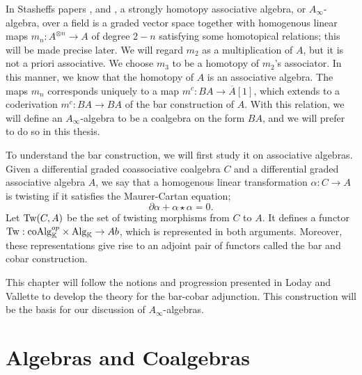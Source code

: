\documentclass[../thesis.tex]{subfiles}
\begin{document}
        In Stasheffs papers \cite{Stasheff63I}, and \cite{Stasheff63II}, a strongly homotopy associative algebra, or $A_\infty$-algebra, over a field is a graded vector space together with homogenous linear maps $m_n: A^{\otimes n}\rightarrow A$ of degree $2-n$ satisfying some homotopical relations; this will be made precise later. We will regard $m_2$ as a multiplication of $A$, but it is not a priori associative. We choose $m_3$ to be a homotopy of $m_2$'s associator. In this manner, we know that the homotopy of $A$ is an associative algebra. The maps $m_n$ corresponds uniquely to a map $m^c:BA\rightarrow \overline{A}[1]$, which extends to a coderivation $m^c : BA\rightarrow BA$ of the bar construction of $A$. With this relation, we will define an $A_\infty$-algebra to be a coalgebra on the form $BA$, and we will prefer to do so in this thesis.


        To understand the bar construction, we will first study it on associative algebras. Given a differential graded coassociative coalgebra $C$ and a differential graded associative algebra $A$, we say that a homogenous linear transformation $\alpha: C\rightarrow A$ is twisting if it satisfies the Maurer-Cartan equation;
            \begin{equation*}
                \partial\alpha + \alpha\star\alpha = 0.
            \end{equation*}
        Let $\tt{Tw}(C, A)$ be the set of twisting morphisms from $C$ to $A$. It defines a functor $\tt{Tw}: \tt{coAlg}_{\mathbb{K}}^{op}\times \tt{Alg}_{\mathbb{K}} \rightarrow Ab$, which is represented in both arguments. Moreover, these representations give rise to an adjoint pair of functors called the bar and cobar construction.

        \begin{center}
        \end{center}

        This chapter will follow the notions and progression presented in Loday and Vallette \cite{Loday12} to develop the theory for the bar-cobar adjunction. This construction will be the basis for our discussion of $A_\infty$-algebras.

    \section{Algebras and Coalgebras}    
\end{document}
